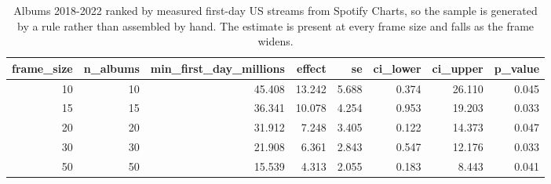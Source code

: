 \begin{table}
\caption{Albums 2018-2022 ranked by measured first-day US streams from Spotify Charts, so the sample is generated by a rule rather than assembled by hand. The estimate is present at every frame size and falls as the frame widens.}
\begin{tabular}{rrrrrrrr}
\toprule
frame\_size & n\_albums & min\_first\_day\_millions & effect & se & ci\_lower & ci\_upper & p\_value \\
\midrule
10 & 10 & 45.408 & 13.242 & 5.688 & 0.374 & 26.110 & 0.045 \\
15 & 15 & 36.341 & 10.078 & 4.254 & 0.953 & 19.203 & 0.033 \\
20 & 20 & 31.912 & 7.248 & 3.405 & 0.122 & 14.373 & 0.047 \\
30 & 30 & 21.908 & 6.361 & 2.843 & 0.547 & 12.176 & 0.033 \\
50 & 50 & 15.539 & 4.313 & 2.055 & 0.183 & 8.443 & 0.041 \\
\bottomrule
\end{tabular}
\end{table}
